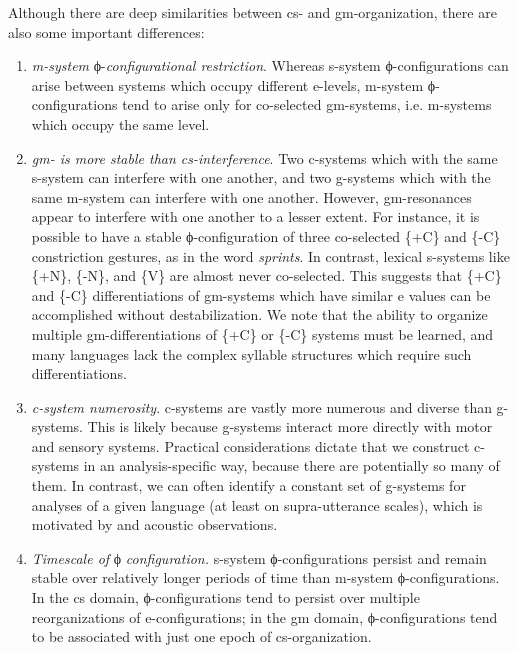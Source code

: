 Although there are deep similarities between cs- and gm-organization, there are also some important differences: 

\begin{enumerate}
\item \textit{m-system} ϕ-\textit{configurational restriction}. Whereas s-system ϕ-configurations can arise between systems which occupy different e-levels, m-system ϕ-configurations tend to arise only for co-selected gm-systems, i.e. m-systems which occupy the same level. 

\item \textit{gm- is more stable than cs-interference}. Two c-systems which  with the same s-system can interfere with one another, and two g-systems which  with the same m-system can interfere with one another. However, gm-resonances appear to interfere with one another to a lesser extent. For instance, it is possible to have a stable ϕ-configuration of three co-selected \{+C\} and \{-C\} constriction gestures, as in the word \textit{sprints}. In contrast, lexical s-systems like \{+N\}, \{-N\}, and \{V\} are almost never co-selected. This suggests that \{+C\} and \{-C\} differentiations of gm-systems which have similar e values can be accomplished without destabilization. We note that the ability to organize multiple gm-differentiations of \{+C\} or \{-C\} systems must be learned, and many languages lack the complex syllable structures which require such differentiations.

\item \textit{c-system numerosity}. c-systems are vastly more numerous and diverse than g-systems. This is likely because g-systems interact more directly with motor and sensory systems. Practical considerations dictate that we construct c-systems in an analysis-specific way, because there are potentially so many of them. In contrast, we can often identify a constant set of g-systems for analyses of a given language (at least on supra-utterance scales), which is motivated  by  and acoustic observations.

\item  \textit{Timescale of} ϕ \textit{configuration.} s-system ϕ-configurations persist and remain stable over relatively longer periods of time than m-system ϕ-configurations. In the cs domain, ϕ-configurations tend to persist over multiple reorganizations of e-configurations; in the gm domain, ϕ-configurations tend to be associated with just one epoch of cs-organization.
\end{enumerate}

